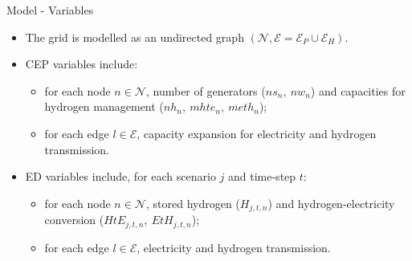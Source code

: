 \documentclass[pdf]{beamer}
\begin{document}
  \begin{frame}{Model - Variables}
   
      \begin{minipage}{0.6\textwidth}
        \begin{itemize}
          \item The grid is modelled as an undirected graph $(\mathcal{N},\mathcal{E}=\mathcal{E}_P\cup\mathcal{E}_H)$.
        \end{itemize}
      \end{minipage}\begin{minipage}{0.35\textwidth}
      \end{minipage}
    \begin{itemize}
      \item CEP variables include: 
      \begin{itemize}
      \item for each node $n\in\mathcal{N}$, number of generators ($ns_n,\ nw_n$) and capacities for hydrogen management ($nh_n,\ mhte_n,\ meth_n$); 
      \item for each edge $l\in\mathcal{E}$, capacity expansion for electricity and hydrogen transmission.
    \end{itemize}
    \vspace{1em}
    \item ED variables include, for each scenario $j$ and time-step $t$:
    \begin{itemize}
    \item for each node $n\in\mathcal{N}$, stored hydrogen ($H_{j,t,n}$) and hydrogen-electricity conversion ($HtE_{j,t,n},\ EtH_{j,t,n}$);
    \item for each edge $l\in\mathcal{E}$, electricity and hydrogen transmission.
    \end{itemize}
      \end{itemize}
  \end{frame}
\end{document}
